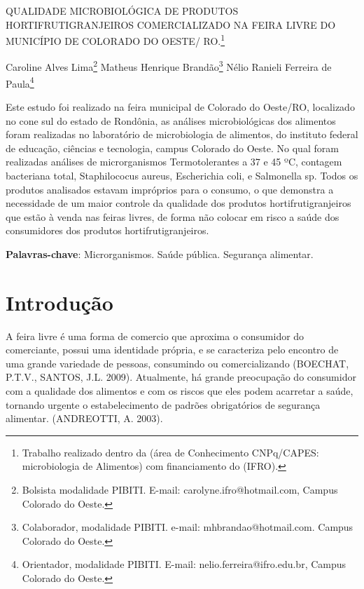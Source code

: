 \documentclass[article,12pt,onesidea,4paper,english,brazil]{abntex2}
\begin{document}
	
	
	\frenchspacing 
	
	\begin{center}
		\LARGE QUALIDADE MICROBIOLÓGICA DE PRODUTOS HORTIFRUTIGRANJEIROS COMERCIALIZADO NA FEIRA LIVRE DO MUNICÍPIO DE COLORADO DO OESTE/ RO.\footnote{Trabalho realizado dentro da (área de Conhecimento CNPq/CAPES: microbiologia de Alimentos) com financiamento do (IFRO).}
		
		\normalsize
		Caroline Alves Lima\footnote{Bolsista modalidade PIBITI. E-mail: carolyne.ifro@hotmail.com, Campus Colorado do Oeste.} 
		Matheus Henrique Brandão\footnote{Colaborador, modalidade PIBITI. e-mail: mhbrandao@hotmail.com. Campus Colorado do Oeste.} 
		Nélio Ranieli Ferreira de Paula\footnote{Orientador, modalidade PIBITI. E-mail: nelio.ferreira@ifro.edu.br, Campus Colorado do Oeste.} 
	\end{center}
	
	\begin{resumoumacoluna}
	Este estudo foi realizado na feira municipal de Colorado do Oeste/RO, localizado no cone sul do estado de Rondônia, as análises microbiológicas dos alimentos foram realizadas no laboratório de microbiologia de alimentos, do instituto federal de educação, ciências e tecnologia, campus Colorado do Oeste. No qual foram realizadas análises de microrganismos Termotolerantes a 37 e 45 ºC, contagem bacteriana total, Staphilococus aureus, Escherichia coli, e Salmonella sp. Todos os produtos analisados estavam impróprios para o consumo, o que demonstra a necessidade de um maior controle da qualidade dos produtos hortifrutigranjeiros que estão à venda nas feiras livres, de forma não colocar em risco a saúde dos consumidores dos produtos hortifrutigranjeiros.
	
		\vspace{\onelineskip}
		
		\noindent
		\textbf{Palavras-chave}: Microrganismos. Saúde pública. Segurança alimentar.
	\end{resumoumacoluna}
	
	\textual
	
	\section*{Introdução}
	
A feira livre é uma forma de comercio que aproxima o consumidor do comerciante, possui uma identidade própria, e se caracteriza pelo encontro de uma grande variedade de pessoas, consumindo ou comercializando (BOECHAT, P.T.V., SANTOS, J.L. 2009). Atualmente, há grande preocupação do consumidor com a qualidade dos alimentos e com os riscos que eles podem acarretar a saúde, tornando urgente o estabelecimento de padrões obrigatórios de segurança alimentar. (ANDREOTTI, A. 2003).
\end{document}
